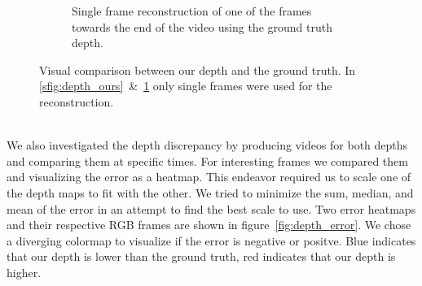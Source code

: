 \begin{figure}[ht!]
\begin{subfigure}[b]{.49\textwidth}
                \caption{Single frame reconstruction of one of the frames towards the end of the video using the ground truth depth.}
                \label{sfig:depth_truth}
            \end{subfigure}
            \caption{Visual comparison between our depth and the ground truth. In \ref{sfig:depth_ours}~\&~\ref{sfig:depth_truth} only single frames were used for the reconstruction.}
            \label{fig:depth_comparisson}
        \end{figure}\\
        \newpage
        We also investigated the depth discrepancy by producing videos for both depths and comparing them at specific times.
        For interesting frames we compared them and visualizing the error as a heatmap.
        This endeavor required us to scale one of the depth maps to fit with the other.
        We tried to minimize the sum, median, and mean of the error in an attempt to find the best scale to use.
        Two error heatmaps and their respective RGB frames are shown in figure~\ref{fig:depth_error}.
        We chose a diverging colormap to visualize if the error is negative or positve.
        Blue indicates that our depth is lower than the ground truth, red indicates that our depth is higher.
